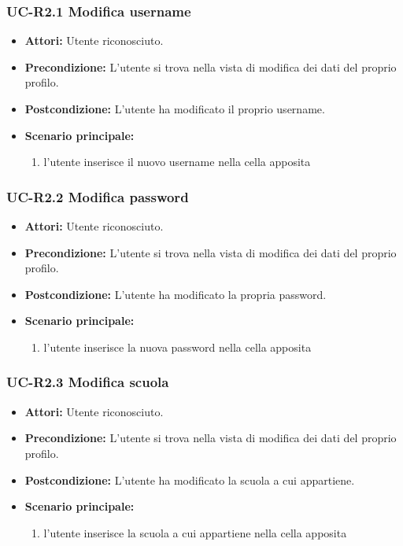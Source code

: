 \subsubsection{UC-R2.1 Modifica username}
\begin{itemize}
			\item \textbf{Attori:} Utente riconosciuto.
			\item \textbf{Precondizione:} L'utente si trova nella vista di modifica dei dati del proprio profilo.
			\item \textbf{Postcondizione:} L'utente ha modificato il proprio username.
			\item \textbf{Scenario principale:}
			\begin{enumerate}
				\item l'utente inserisce il nuovo username nella cella apposita
			\end{enumerate}
\end{itemize}

\subsubsection{UC-R2.2 Modifica password}
\begin{itemize}
			\item \textbf{Attori:} Utente riconosciuto.
			\item \textbf{Precondizione:} L'utente si trova nella vista di modifica dei dati del proprio profilo.
			\item \textbf{Postcondizione:} L'utente ha modificato la propria password.
			\item \textbf{Scenario principale:}
			\begin{enumerate}
				\item l'utente inserisce la nuova password nella cella apposita
			\end{enumerate}
\end{itemize}

\subsubsection{UC-R2.3 Modifica scuola}
\begin{itemize}
			\item \textbf{Attori:} Utente riconosciuto.
			\item \textbf{Precondizione:} L'utente si trova nella vista di modifica dei dati del proprio profilo.
			\item \textbf{Postcondizione:} L'utente ha modificato la scuola a cui appartiene.
			\item \textbf{Scenario principale:}
			\begin{enumerate}
				\item l'utente inserisce la scuola a cui appartiene nella cella apposita
			\end{enumerate}
\end{itemize}

